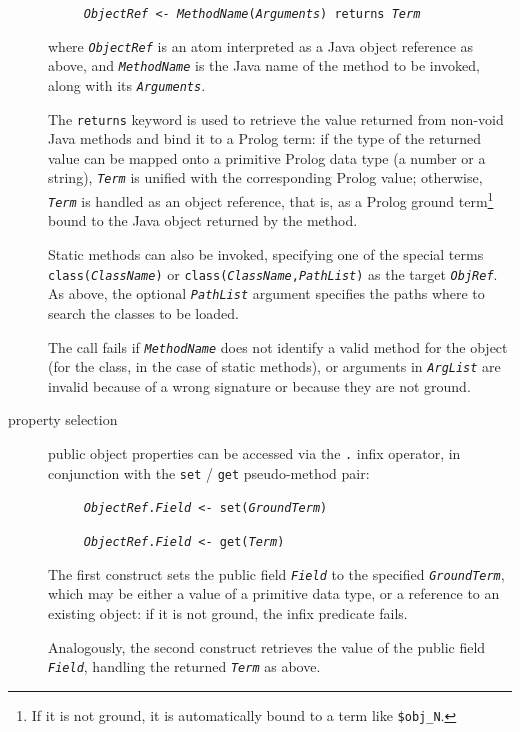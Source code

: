 \begin{description}
        \texttt{~~~~~\textit{ObjectRef} <- \textit{MethodName}(\textit{Arguments})
                returns \textit{Term}}

        where \texttt{\textit{ObjectRef}} is an atom interpreted as a Java object
        reference as above, and \texttt{\textit{MethodName}} is the Java name of the method to be invoked, along with its \texttt{\textit{Arguments}}.

        The \texttt{returns} keyword is used to retrieve the value returned from non-void Java methods and bind it to a Prolog term: if the type of the returned value can be mapped onto a primitive Prolog data type (a number or a string), \texttt{\textit{Term}} is unified with the corresponding Prolog value; otherwise, \texttt{\textit{Term}} is handled as an object reference, that is, as a Prolog ground term\footnote{If it is not ground, it is automatically bound to a term like \texttt{\$obj\_N}.} bound to the Java object returned by the method.

        Static methods can also be invoked, specifying one of the special terms \texttt{class(\textit{ClassName})} or \texttt{class(\textit{ClassName},\textit{PathList})} as the target \texttt{\textit{ObjRef}}.
        As above, the optional \texttt{\textit{PathList}} argument specifies the paths where to search the classes to be loaded.

        The call fails if \texttt{\textit{MethodName}} does not identify a valid method for the object (for the class, in the case of static methods), or arguments in \texttt{\textit{ArgList}} are invalid because of a wrong signature or because they are not ground.

  \item [property selection]
        public object properties can be accessed via the \texttt{.} infix operator, in conjunction with the \texttt{set} / \texttt{get} pseudo-method pair:

        \texttt{~~~~~\textit{ObjectRef}.\textit{Field} <- set(\textit{GroundTerm})}

        \texttt{~~~~~\textit{ObjectRef}.\textit{Field} <- get(\textit{Term})}

        The first construct sets the public field \texttt{\textit{Field}} to the specified \texttt{\textit{GroundTerm}}, which may be either a value of a primitive data type, or a reference to an existing object: if it is not ground, the infix predicate fails.

        Analogously, the second construct retrieves the value of the public field
        \texttt{\textit{Field}}, handling the returned \texttt{\textit{Term}} as above.


\end{description}
